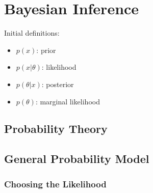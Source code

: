 
\chapter{Bayesian Inference}
\minitoc

\citep{Gelman2013}

Initial definitions:
\begin{itemize}
    \item $p(x)$: prior
    \item $p(x|\theta)$: likelihood
    \item $p(\theta|x)$: posterior
    \item $p(\theta)$: marginal likelihood
\end{itemize}

\section{Probability Theory}

\section{General Probability Model}

\subsection{Choosing the Likelihood}

\clearpage
\printbibliography[segment=\therefsegment,heading=subbibintoc]